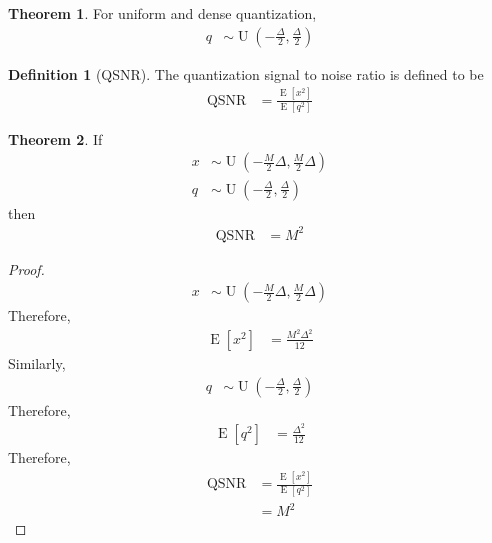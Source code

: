 \documentclass[titlepage, fleqn, a4paper, 12pt, twoside]{article}
\theoremstyle{definition}
\newtheorem{definition}{Definition}
\theoremstyle{theorem}
\newtheorem{theorem}{Theorem}
\DeclareMathOperator{\expct}{\mathrm{E}}
\DeclareMathOperator{\uniform}{\mathrm{U}}
\DeclareMathOperator{\QSNR}{\mathrm{QSNR}}
\begin{document}
\begin{theorem}
	For uniform and dense quantization,
	\begin{align*}
		q &\sim \uniform\left( -\frac{\Delta}{2},\frac{\Delta}{2} \right)
	\end{align*}
\end{theorem}

\begin{definition}[QSNR]
	The quantization signal to noise ratio is defined to be
	\begin{align*}
		\QSNR &= \frac{\expct\left[ x^2 \right]}{\expct\left[ q^2 \right]}
	\end{align*}
\end{definition}

\begin{theorem}
	If
	\begin{align*}
		x &\sim \uniform\left( -\frac{M}{2} \Delta,\frac{M}{2} \Delta \right)\\
		q &\sim \uniform\left( -\frac{\Delta}{2},\frac{\Delta}{2} \right)
	\end{align*}
	then
	\begin{align*}
		\QSNR &= M^2
	\end{align*}
\end{theorem}

\begin{proof}
	\begin{align*}
		x &\sim \uniform\left( -\frac{M}{2} \Delta,\frac{M}{2} \Delta \right)
	\end{align*}
	Therefore,
	\begin{align*}
		\expct\left[ x^2 \right] &= \frac{M^2 \Delta^2}{12}
	\end{align*}
	Similarly,
	\begin{align*}
		q &\sim \uniform\left( -\frac{\Delta}{2},\frac{\Delta}{2} \right)
	\end{align*}
	Therefore,
	\begin{align*}
		\expct\left[ q^2 \right] &= \frac{\Delta^2}{12}
	\end{align*}
	Therefore,
	\begin{align*}
		\QSNR &= \frac{\expct\left[ x^2 \right]}{\expct\left[ q^2 \right]}\\
		&= M^2
	\end{align*}
\end{proof}
\end{document}

